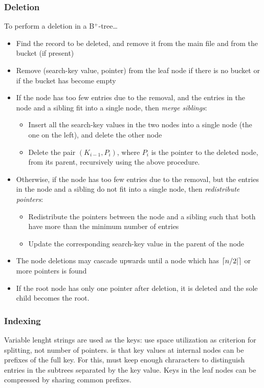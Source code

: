 \documentclass{article}
\begin{document}
\subsubsection{Deletion}

To perform a deletion in a B$^{+}$-tree\dots 
\begin{itemize}
  \item Find the record to be deleted, and remove it from the main file and from the bucket (if present)
  \item Remove (search-key value, pointer) from the leaf node if there is no bucket or if the bucket has become empty 
  \item If the node has too few entries due to the removal, and the entries in the node and a sibling fit into a single node, then \emph{merge siblings}: 
    \begin{itemize}
      \item Insert all the search-key values in the two nodes into a single node (the one on the left), and delete the other node 
      \item Delete the pair $(K_{i-1}, P_{i})$, where $P_i$ is the pointer to the deleted node, from its parent, recursively using the above procedure. 
    \end{itemize}
  \item Otherwise, if the node has too few entries due to the removal, but the entries in the node and a sibling do not fit into a single node, then \emph{redistribute pointers}: 
    \begin{itemize}
      \item Redistribute the pointers between the node and a sibling such that both have more than the minimum number of entries 
      \item Update the corresponding search-key value in the parent of the node
    \end{itemize}
  \item The node deletions may cascade upwards until a node which has $\left\lceil n/2| \right\rceil$ or more pointers is found 
  \item If the root node has only one pointer after deletion, it is deleted and the sole child becomes the root. 
\end{itemize}

\subsubsection{Indexing}

Variable lenght strings are used as the keys: use space utilization as criterion for splitting, not number of pointers.  is that key values at internal nodes can be prefixes of the full key. For this, must keep enough chraracters to distinguish entries in the subtrees separated by the key value. Keys in the leaf nodes can be compressed by sharing common prefixes. \\ 
\end{document}
